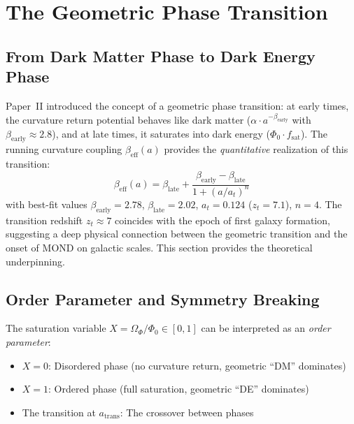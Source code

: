 \documentclass[aps,prd,twocolumn,superscriptaddress,nofootinbib]{revtex4-2}
\begin{document}
\section{The Geometric Phase Transition}
\label{sec:phase_transition}

\subsection{From Dark Matter Phase to Dark Energy Phase}

Paper~II \cite{Geiger2026b} introduced the concept of a geometric phase transition: at early times, the curvature return potential behaves like dark matter ($\alpha \cdot a^{-\beta_{\mathrm{early}}}$ with $\beta_{\mathrm{early}} \approx 2.8$), and at late times, it saturates into dark energy ($\Phi_0 \cdot f_{\mathrm{sat}}$). The running curvature coupling $\beta_{\mathrm{eff}}(a)$ provides the \textit{quantitative} realization of this transition:
\begin{equation}
\beta_{\mathrm{eff}}(a) = \beta_{\mathrm{late}} + \frac{\beta_{\mathrm{early}} - \beta_{\mathrm{late}}}{1 + (a/a_t)^n}
\end{equation}
with best-fit values $\beta_{\mathrm{early}} = 2.78$, $\beta_{\mathrm{late}} = 2.02$, $a_t = 0.124$ ($z_t = 7.1$), $n = 4$. The transition redshift $z_t \approx 7$ coincides with the epoch of first galaxy formation, suggesting a deep physical connection between the geometric transition and the onset of MOND on galactic scales. This section provides the theoretical underpinning.

\subsection{Order Parameter and Symmetry Breaking}

The saturation variable $X = \Omega_\Phi / \Phi_0 \in [0, 1]$ can be interpreted as an \textit{order parameter}:
\begin{itemize}
\item $X = 0$: Disordered phase (no curvature return, geometric ``DM'' dominates)
\item $X = 1$: Ordered phase (full saturation, geometric ``DE'' dominates)
\item The transition at $a_{\mathrm{trans}}$: The crossover between phases
\end{itemize}
\end{document}

